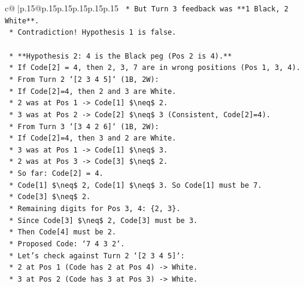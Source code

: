 \documentclass{article}
\begin{document}
{\begin{supertabular}{c@{$\;$}|p{.15\linewidth}@{}p{.15\linewidth}p{.15\linewidth}p{.15\linewidth}p{.15\linewidth}p{.15\linewidth}}
{{{\texttt{                *   But Turn 3 feedback was **1 Black, 2 White**.} \\
\texttt{                *   Contradiction! Hypothesis 1 is false.} \\
\\ 
\texttt{    *   **Hypothesis 2: 4 is the Black peg (Pos 2 is 4).**} \\
\texttt{        *   If Code{[}2{]} = 4, then 2, 3, 7 are in wrong positions (Pos 1, 3, 4).} \\
\texttt{        *   From Turn 2 `{[}2 3 4 5{]}` (1B, 2W):} \\
\texttt{            *   If Code{[}2{]}=4, then 2 and 3 are White.} \\
\texttt{            *   2 was at Pos 1 {-}> Code{[}1{]} \$\textbackslash{}neq\$ 2.} \\
\texttt{            *   3 was at Pos 2 {-}> Code{[}2{]} \$\textbackslash{}neq\$ 3 (Consistent, Code{[}2{]}=4).} \\
\texttt{        *   From Turn 3 `{[}3 4 2 6{]}` (1B, 2W):} \\
\texttt{            *   If Code{[}2{]}=4, then 3 and 2 are White.} \\
\texttt{            *   3 was at Pos 1 {-}> Code{[}1{]} \$\textbackslash{}neq\$ 3.} \\
\texttt{            *   2 was at Pos 3 {-}> Code{[}3{]} \$\textbackslash{}neq\$ 2.} \\
\texttt{        *   So far: Code{[}2{]} = 4.} \\
\texttt{            *   Code{[}1{]} \$\textbackslash{}neq\$ 2, Code{[}1{]} \$\textbackslash{}neq\$ 3. So Code{[}1{]} must be 7.} \\
\texttt{            *   Code{[}3{]} \$\textbackslash{}neq\$ 2.} \\
\texttt{            *   Remaining digits for Pos 3, 4: \{2, 3\}.} \\
\texttt{            *   Since Code{[}3{]} \$\textbackslash{}neq\$ 2, Code{[}3{]} must be 3.} \\
\texttt{            *   Then Code{[}4{]} must be 2.} \\
\texttt{            *   Proposed Code: `7 4 3 2`.} \\
\texttt{            *   Let's check against Turn 2 `{[}2 3 4 5{]}`:} \\
\texttt{                *   2 at Pos 1 (Code has 2 at Pos 4) {-}> White.} \\
\texttt{                *   3 at Pos 2 (Code has 3 at Pos 3) {-}> White.} \\
}}}
\end{supertabular}}
\end{document}
